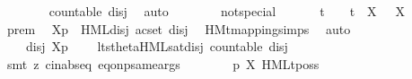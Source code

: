 \begin{isabellebody}
\ \ \ \ \ \ \isamarkupfalse%
\ {\isacartoucheopen}countable\ {\isacharquery}{\kern0pt}disj{\isacartoucheclose}\ \isamarkupfalse%
\ auto\isanewline
\ \ \ \ \ \ \isamarkupfalse%
\ {\isasymalpha}{\isacharunderscore}{\kern0pt}not{\isacharunderscore}{\kern0pt}special{\isacharcolon}{\kern0pt}\ {\isacartoucheopen}{\isasymalpha}\ {\isasymnoteq}\ {\isasymtau}\ {\isasymand}\ {\isasymalpha}\ {\isasymnoteq}\ t\ {\isasymand}\ {\isasymalpha}\ {\isasymnoteq}\ t{\isacharunderscore}{\kern0pt}{\isasymepsilon}\ {\isasymand}\ {\isacharparenleft}{\kern0pt}{\isasymforall}X{\isachardot}{\kern0pt}\ {\isasymalpha}\ {\isasymnoteq}\ {\isasymepsilon}{\isacharbrackleft}{\kern0pt}X{\isacharbrackright}{\kern0pt}{\isacharparenright}{\kern0pt}{\isacartoucheclose}\isanewline
\ \ \ \ \ \ \isamarkupfalse%
\ prem\ \isamarkupfalse%
\ {\isacartoucheopen}{\isasymtheta}{\isacharbrackleft}{\kern0pt}X{\isacharbrackright}{\kern0pt}{\isacharparenleft}{\kern0pt}p{\isacharparenright}{\kern0pt}\ {\isasymTurnstile}\ HML{\isacharunderscore}{\kern0pt}disj\ {\isacharparenleft}{\kern0pt}acset\ {\isacharquery}{\kern0pt}disj{\isacharparenright}{\kern0pt}{\isacartoucheclose}\ \isamarkupfalse%
\ HMt{\isacharunderscore}{\kern0pt}mapping{\isachardot}{\kern0pt}simps{\isacharparenleft}{\kern0pt}{}{\isacharparenright}{\kern0pt}\ \isamarkupfalse%
\ auto\isanewline
\ \ \ \ \ \ \isamarkupfalse%
\ {\isacartoucheopen}{\isasymexists}\ {\isasymphi}{\isacharprime}{\kern0pt}\ {\isasymin}\ {\isacharquery}{\kern0pt}disj{\isachardot}{\kern0pt}\ {\isasymtheta}{\isacharbrackleft}{\kern0pt}X{\isacharbrackright}{\kern0pt}{\isacharparenleft}{\kern0pt}p{\isacharparenright}{\kern0pt}\ {\isasymTurnstile}\ {\isasymphi}{\isacharprime}{\kern0pt}{\isacartoucheclose}\ \isamarkupfalse%
\ lts{\isacharunderscore}{\kern0pt}theta{\isachardot}{\kern0pt}HML{\isacharunderscore}{\kern0pt}sat{\isacharunderscore}{\kern0pt}disj\ {\isacartoucheopen}countable\ {\isacharquery}{\kern0pt}disj{\isacartoucheclose}\isanewline
\ \ \ \ \ \ \ \ \isamarkupfalse%
\ {\isacharparenleft}{\kern0pt}smt\ {\isacharparenleft}{\kern0pt}z{}{\isacharparenright}{\kern0pt}\ cin{\isachardot}{\kern0pt}abs{\isacharunderscore}{\kern0pt}eq\ eq{\isacharunderscore}{\kern0pt}onp{\isacharunderscore}{\kern0pt}same{\isacharunderscore}{\kern0pt}args{\isacharparenright}{\kern0pt}\isanewline
\ \ \ \ \ \ \isamarkupfalse%
\ {\isacartoucheopen}p\ {\isasymTTurnstile}{\isacharbrackleft}{\kern0pt}X{\isacharbrackright}{\kern0pt}\ HMLt{\isacharunderscore}{\kern0pt}poss\ {\isasymalpha}\ {\isasymphi}{\isacartoucheclose}\ \isamarkupfalse%

\end{isabellebody}
